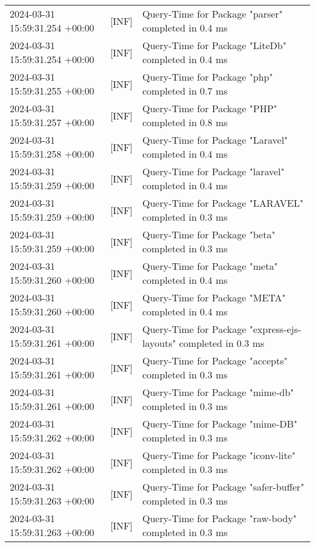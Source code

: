{{\begin{tabularx}{\textwidth}{|l|l|X|}
                    2024-03-31 15:59:31.254 +00:00 & [INF] & Query-Time for Package "parser" completed in 0.4 ms \\
                    2024-03-31 15:59:31.254 +00:00 & [INF] & Query-Time for Package "LiteDb" completed in 0.4 ms \\
                    2024-03-31 15:59:31.255 +00:00 & [INF] & Query-Time for Package "php" completed in 0.7 ms \\
                    2024-03-31 15:59:31.257 +00:00 & [INF] & Query-Time for Package "PHP" completed in 0.8 ms \\
                    2024-03-31 15:59:31.258 +00:00 & [INF] & Query-Time for Package "Laravel" completed in 0.4 ms \\
                    2024-03-31 15:59:31.259 +00:00 & [INF] & Query-Time for Package "laravel" completed in 0.4 ms \\
                    2024-03-31 15:59:31.259 +00:00 & [INF] & Query-Time for Package "LARAVEL" completed in 0.3 ms \\
                    2024-03-31 15:59:31.259 +00:00 & [INF] & Query-Time for Package "beta" completed in 0.3 ms \\
                    2024-03-31 15:59:31.260 +00:00 & [INF] & Query-Time for Package "meta" completed in 0.4 ms \\
                    2024-03-31 15:59:31.260 +00:00 & [INF] & Query-Time for Package "META" completed in 0.4 ms \\
                    2024-03-31 15:59:31.261 +00:00 & [INF] & Query-Time for Package "express-ejs-layouts" completed in 0.3 ms \\
                    2024-03-31 15:59:31.261 +00:00 & [INF] & Query-Time for Package "accepts" completed in 0.3 ms \\
                    2024-03-31 15:59:31.261 +00:00 & [INF] & Query-Time for Package "mime-db" completed in 0.3 ms \\
                    2024-03-31 15:59:31.262 +00:00 & [INF] & Query-Time for Package "mime-DB" completed in 0.3 ms \\
                    2024-03-31 15:59:31.262 +00:00 & [INF] & Query-Time for Package "iconv-lite" completed in 0.3 ms \\
                    2024-03-31 15:59:31.263 +00:00 & [INF] & Query-Time for Package "safer-buffer" completed in 0.3 ms \\
                    2024-03-31 15:59:31.263 +00:00 & [INF] & Query-Time for Package "raw-body" completed in 0.3 ms \\

\end{tabularx}}}

